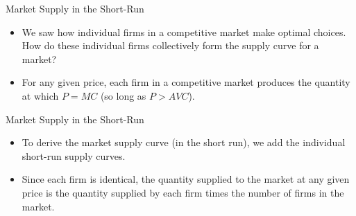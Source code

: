 \documentclass[xcolor={dvipsnames},pdf, hyperref={colorlinks=true, citecolor=ForestGreen, linkcolor=BlueViolet, urlcolor=Magenta}, handout]{beamer}
\begin{document}
\begin{frame}{Market Supply in the Short-Run}
\begin{itemize}
	\item 	We saw how individual firms in a competitive market make optimal choices. How do these individual firms collectively form the supply curve for a market? 
	\item 	For any given price, each firm in a competitive market produces the quantity at which $P = MC$ (so long as $P > AVC$). 

\end{itemize}
\end{frame}


\begin{frame}{Market Supply in the Short-Run}
	\begin{itemize}
		\item To derive the market supply curve (in the short run), we add the individual short-run supply curves. 
		\item Since each firm is identical, the quantity supplied to the market at any given price is the quantity supplied by each firm times the number of firms in the market.
		
	\end{itemize}
\end{frame}
\end{document}
